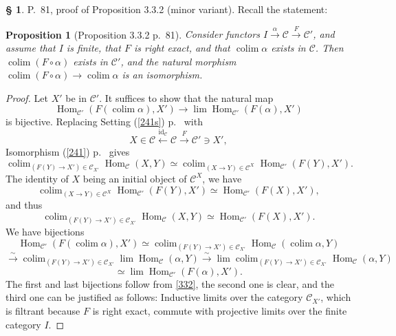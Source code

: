 \documentclass[12pt]{article}
\newtheorem{prop}[thm]{Proposition}
\theoremstyle{remark}
\theoremstyle{definition}
\newtheorem{s}[thm]{\S}
\newcommand{\C}{\mathcal C}
\newcommand{\xr}{\xrightarrow}
\DeclareMathOperator*{\colim}{colim}
\DeclareMathOperator{\id}{id}
\DeclareMathOperator{\Hom}{Hom}
\begin{document}
\begin{s} 
P.~81, proof of Proposition 3.3.2 (minor variant). Recall the statement:

\begin{prop}[Proposition 3.3.2 p.~81]\label{p332} 
Consider functors $I\xrightarrow\alpha\C\xrightarrow F\C'$, and assume that $I$ is finite, that $F$ is right exact, and that $\colim\alpha$ exists in $\C$. Then $\colim(F\circ\alpha)$ exists in $\C'$, and the natural morphism $\colim(F\circ\alpha)\to\colim\alpha$ is an isomorphism. 
\end{prop} 

\begin{proof}
Let $X'$ be in $\C'$. It suffices to show that the natural map 
$$
\Hom_{\C'}(F(\colim\alpha),X')\to\lim\Hom_{\C'}(F(\alpha),X')
$$ 
is bijective. Replacing Setting (\ref{241s}) p.~\pageref{241s} with 
$$
X\in\C\xleftarrow{\id_\C}\C\xrightarrow{F}\C'\ni X', 
$$ 
Isomorphism (\ref{241}) p.~\pageref{241} gives 
$$
\colim_{(F(Y)\to X')\in\C_{X'}}\Hom_\C(X,Y)\simeq\colim_{(X\to Y)\in\C^X}\Hom_{\C'}(F(Y),X').
$$ 
The identity of $X$ being an initial object of $\C^X$, we have 
$$
\colim_{(X\to Y)\in\C^X}\Hom_{\C'}(F(Y),X')\simeq\Hom_{\C'}(F(X),X'),
$$ 
and thus
%
\begin{equation}\label{332} 
\colim_{(F(Y)\to X')\in\C_{X'}}\Hom_\C(X,Y)\simeq\Hom_{\C'}(F(X),X').
\end{equation} 
%
We have bijections 
$$ 
\Hom_{\C'}(F(\colim\alpha),X')\simeq\colim_{(F(Y)\to X')\in\C_{X'}}\Hom_\C(\colim\alpha,Y)
$$
$$
\xr\sim\colim_{(F(Y)\to X')\in\C_{X'}}\lim\Hom_\C(\alpha,Y)\xr\sim\lim\colim_{(F(Y)\to X')\in\C_{X'}}\Hom_\C(\alpha,Y)
$$
$$
\simeq\lim\Hom_{\C'}(F(\alpha),X'). 
$$ 
The first and last bijections follow from \eqref{332}, the second one is clear, and the third one can be justified as follows: Inductive limits over the category $\C_{X'}$, which is filtrant because $F$ is right exact, commute with projective limits over the finite category $I$.
\end{proof}
\end{s}

%
\end{document}
